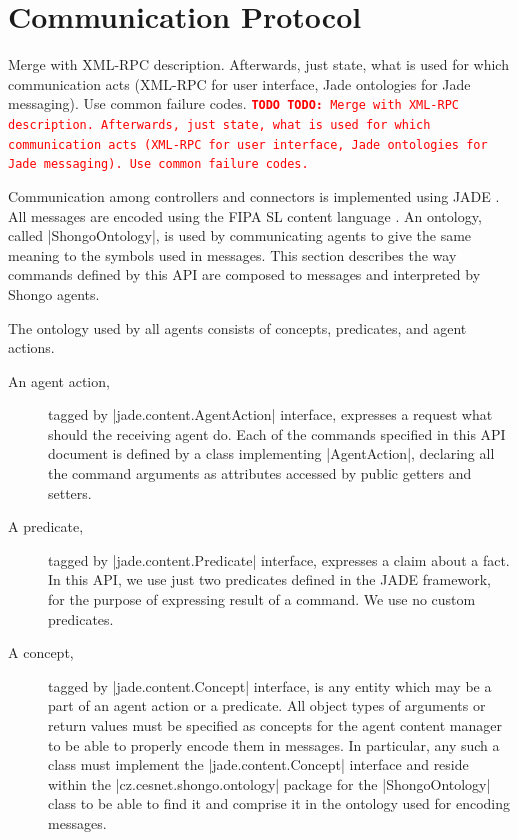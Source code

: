 \documentclass[a4paper]{report}
\newcommand{\TODO}[1]{%
\def\empty{}%
\def\prvniparametr{#1}%
\ifx\prvniparametr\empty%
\begingroup\tt\textcolor{red}{\noindent\textbf{TODO}}\endgroup
\else%
\begingroup\tt\textcolor{red}{\noindent\textbf{TODO:}\ #1}\endgroup
\fi%
}
\begin{document}
\section{Communication Protocol}

\TODO{Merge with XML-RPC description. Afterwards, just state, what is used for which communication acts (XML-RPC for user interface, Jade ontologies for Jade messaging). Use common failure codes.}

Communication among controllers and connectors is implemented using JADE \cite{jade}. All messages are encoded using the FIPA SL content language \cite{FIPA-SL}. An ontology, called |ShongoOntology|, is used by communicating agents to give the same meaning to the symbols used in messages. This section describes the way commands defined by this API are composed to messages and interpreted by Shongo agents.

The ontology used by all agents consists of concepts, predicates, and agent actions.
\begin{description}
\item[An agent action,] tagged by |jade.content.AgentAction| interface, expresses a request what should the receiving agent do. Each of the commands specified in this API document is defined by a class implementing |AgentAction|, declaring all the command arguments as attributes accessed by public getters and setters.
\item[A predicate,] tagged by |jade.content.Predicate| interface, expresses a claim about a fact. In this API, we use just two predicates defined in the JADE framework, for the purpose of expressing result of a command. We use no custom predicates.
\item[A concept,] tagged by |jade.content.Concept| interface, is any entity which may be a part of an agent action or a predicate. All object types of arguments or return values must be specified as concepts for the agent content manager to be able to properly encode them in messages. In particular, any such a class must implement the |jade.content.Concept| interface and reside within the |cz.cesnet.shongo.ontology| package for the |ShongoOntology| class to be able to find it and comprise it in the ontology used for encoding messages.
\end{description}
\end{document}

